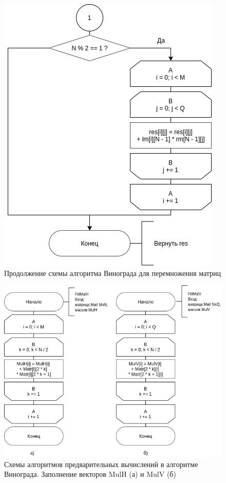 \begin{figure}[!htb]
	\centering
	\includegraphics[scale=0.6]{schemes/win-bottom}
	\caption{Продолжение схемы алгоритма Винограда для перемножения матриц}
	\label{scheme:win-bottom}
\end{figure}


\begin{figure}[!htb]
	\centering
	\includegraphics[scale=0.6]{schemes/fillmul}
	\caption{Схемы алгоритмов предварительных вычислений в алгоритме Винограда. Заполнение векторов MulH (а) и MulV (б)}
	\label{scheme:fillmul}
\end{figure}


